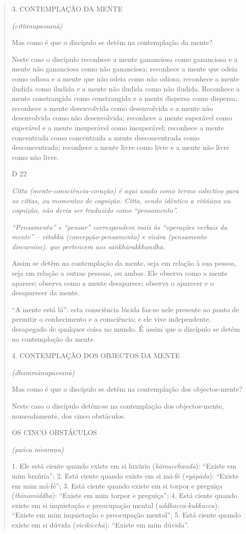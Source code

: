 \begin{quote}
3. CONTEMPLAÇÃO DA MENTE

\emph{(cittānupassanā)}

Mas como é que o discípulo se detém na contemplação da mente?

Neste caso o discípulo reconhece a mente gananciosa como gananciosa e a mente não gananciosa como não gananciosa; reconhece a mente que odeia como odiosa e a mente que não odeia como não odiosa; reconhece a mente iludida como iludida e a mente não iludida como não iludida. Reconhece a mente constrangida como constrangida e a mente dispersa como dispersa; reconhece a mente desenvolvida como desenvolvida e a mente não desenvolvida como não desenvolvida; reconhece a mente superável como superável e a mente insuperável como insuperável; reconhece a mente concentrada como concentrada a mente desconcentrada como desconcentrada; reconhece a mente livre como livre e a mente não livre como não livre.

D 22

\emph{Citta (mente-consciência-coração) é aqui usado como termo colectivo para os cittas, ou momentos de cognição. Citta, sendo idêntico a viññāṇa ou cognição, não devia ser traduzido como ``pensamento''.}

\emph{``Pensamento'' e ``pensar'' correspondem mais às ``operações verbais da mente'' -- vitakka (concepção-pensamento) e vicāra (pensamento discursivo), que pertencem aos saṅkhārakkhandha.}

Assim se detém na contemplação da mente, seja em relação à sua pessoa, seja em relação a outras pessoas, ou ambas. Ele observa como a mente aparece; observa como a mente desaparece; observa o aparecer e o desaparecer da mente.

``A mente está lá'': esta consciência lúcida faz-se nele presente ao ponto de permitir o conhecimento e a consciência; e ele vive independente, desapegado de qualquer coisa no mundo. É assim que o discípulo se detém na contemplação da mente.

4. CONTEMPLAÇÃO DOS OBJECTOS DA MENTE

\emph{(dhammānupassanā)}

Mas como é que o discípulo se detém na contemplação dos objectos-mente?

Neste caso o discípulo detém-se na contemplação dos objectos-mente, nomeadamente, dos cinco obstáculos.

OS CINCO OBSTÁCULOS

\emph{(pañca nīvaraṇa)}

1. Ele está ciente quando existe em si luxúria (\emph{kāmacchanda}): ``Existe em mim luxúria''; 2. Está ciente quando existe em si má-fé (\emph{vyāpāda}): ``Existe em mim má-fé''; 3. Está ciente quando existe em si torpor e preguiça (\emph{thīnamiddha}): ``Existe em mim torpor e preguiça''; 4. Está ciente quando existe em si inquietação e preocupação mental (\emph{uddhacca-kukkucca}): ``Existe em mim inquietação e preocupação mental''; 5. Está ciente quando existe em si dúvida (\emph{vicikicchā}): ``Existe em mim dúvida''.


\end{quote}
